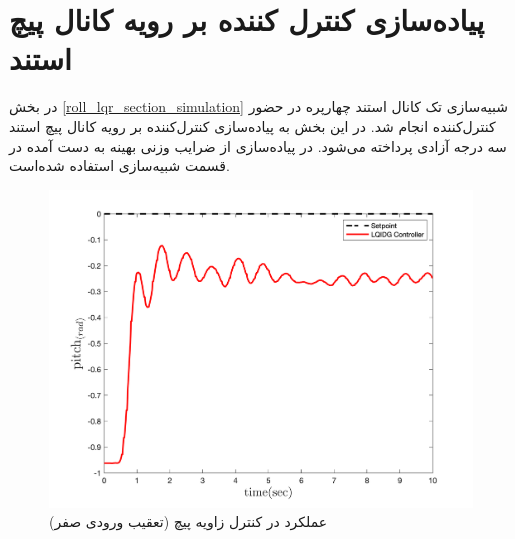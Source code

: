 \section{پیاده‌سازی کنترل کننده  بر رویه کانال پیچ استند}
در بخش
\ref{roll_lqr_section_simulation}
شبیه‌سازی تک کانال استند چهارپره در حضور کنترل‌کننده  انجام شد. در این بخش به پیاده‌سازی کنترل‌کننده  بر رویه کانال پیچ استند سه درجه آزادی پرداخته می‌شود. در پیاده‌سازی از ضرایب وزنی بهینه به دست آمده در قسمت شبیه‌سازی استفاده شده‌است.
\begin{figure}
	\includegraphics[width=.48\linewidth]{../Figures/Calibration/LQR/Pitch/lqr_pitch.png}
	\centering
	\caption{عملكرد  در کنترل زاويه پیچ (تعقیب ورودی صفر)}
\end{figure}
%
